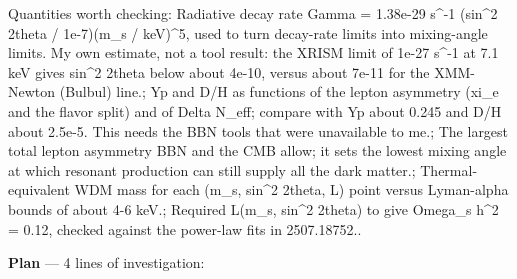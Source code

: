 \documentclass[11pt,a4paper]{article}
\begin{document}
Quantities worth checking: Radiative decay rate Gamma = 1.38e-29 s\textasciicircum{}-1 (sin\textasciicircum{}2 2theta / 1e-7)(m\_s / keV)\textasciicircum{}5, used to turn decay-rate limits into mixing-angle limits. My own estimate, not a tool result: the XRISM limit of 1e-27 s\textasciicircum{}-1 at 7.1 keV gives sin\textasciicircum{}2 2theta below about 4e-10, versus about 7e-11 for the XMM-Newton (Bulbul) line.; Yp and D/H as functions of the lepton asymmetry (xi\_e and the flavor split) and of Delta N\_eff; compare with Yp about 0.245 and D/H about 2.5e-5. This needs the BBN tools that were unavailable to me.; The largest total lepton asymmetry BBN and the CMB allow; it sets the lowest mixing angle at which resonant production can still supply all the dark matter.; Thermal-equivalent WDM mass for each (m\_s, sin\textasciicircum{}2 2theta, L) point versus Lyman-alpha bounds of about 4-6 keV.; Required L(m\_s, sin\textasciicircum{}2 2theta) to give Omega\_s h\textasciicircum{}2 = 0.12, checked against the power-law fits in 2507.18752..

\textbf{Plan} --- 4 lines of investigation:
\end{document}
